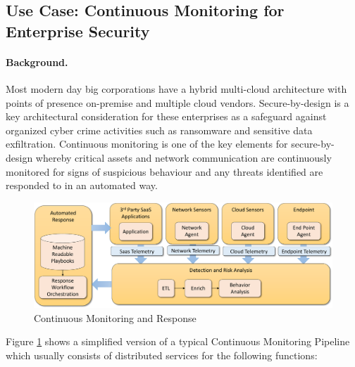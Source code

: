 \subsection{Use Case: Continuous Monitoring for Enterprise Security}


\paragraph*{Background.}
Most modern day big corporations have a hybrid multi-cloud architecture 
with points of presence on-premise and multiple cloud vendors. 
Secure-by-design is a key architectural consideration for these 
enterprises as a safeguard against organized cyber crime activities 
such as ransomware and sensitive data exfiltration. Continuous monitoring 
is one of the key elements for secure-by-design whereby critical 
assets and network communication are continuously monitored for signs 
of suspicious behaviour and any threats identified are responded to in an automated way.

\begin{figure}[htb]
\centering\includegraphics[width=0.8\columnwidth]{usecase/images/nist-security.pdf}

\caption{Continuous Monitoring and Response}
\label{fig:sec-general}
\end{figure}

Figure \ref{fig:sec-general} shows a simplified version of a typical 
Continuous Monitoring Pipeline which usually consists of distributed services for the following functions:

